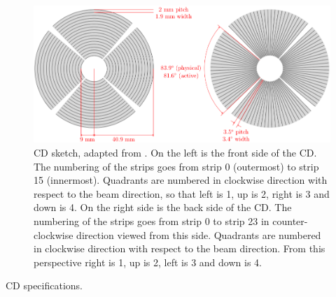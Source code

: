 \documentclass[twoside,english]{uiofysmaster/uiofysmaster}
\begin{document}
\begin{figure}[ht]
	\centering
	\includegraphics[width=\linewidth]{Images/CD.png}
	\caption{CD sketch, adapted from \cite{NWarr-CD}. On the left is the front side of the CD. The numbering of the strips goes from strip 0 (outermost) to strip 15 (innermost). Quadrants are numbered in clockwise direction with respect to the beam direction, so that left is 1, up is 2, right is 3 and down is 4. On the right side is the back side of the CD. The numbering of the strips goes from strip 0 to strip 23 in counter-clockwise direction viewed from this side. Quadrants are numbered in clockwise direction with respect to the beam direction. From this perspective right is 1, up is 2, left is 3 and down is 4.}
	\label{fig:CD-FB}
\end{figure}


\begin{table}[ht] 
    \centering 
    \caption{CD specifications.}
	
	\label{tab:CD_spec}
\end{table}
\end{document}
